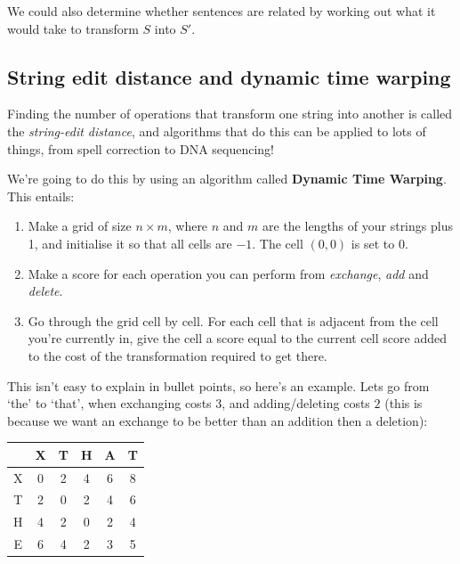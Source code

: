 We could also determine whether sentences are related by working out what it
would take to transform $S$ into $S'$. 

\subsection{String edit distance and dynamic time warping}

Finding the number of operations that transform one string into another is
called the \textit{string-edit distance}, and algorithms that do this can be
applied to lots of things, from spell correction to DNA sequencing!

We're going to do this by using an algorithm called \textbf{Dynamic Time
Warping}. This entails:

\begin{enumerate}
  \item Make a grid of size $n \times m$, where $n$ and $m $ are the lengths of
    your strings plus 1, and initialise it so that all cells are $-1$. The cell
    $(0,0)$ is set to $0$.
  \item Make a score for each operation you can perform from \textit{exchange},
    \textit{add} and \textit{delete}.
  \item Go through the grid cell by cell. For each cell that is adjacent from
    the cell you're currently in, give the cell a score equal to the current
    cell score added to the cost of the transformation required to get there.
\end{enumerate}

This isn't easy to explain in bullet points, so here's an example. Lets go from
`the' to `that', when exchanging costs $3$, and adding/deleting costs $2$ (this
is because we want an exchange to be better than an addition then a deletion):

\begin{center}
  \begin{tabular}{c|c c c c c}
      & X & T & H & A & T\\ \hline
    X & 0 & 2 & 4 & 6 & 8\\ 
    T & 2 & 0 & 2 & 4 & 6\\
    H & 4 & 2 & 0 & 2 & 4\\
    E & 6 & 4 & 2 & 3 & 5
  \end{tabular}
\end{center}

